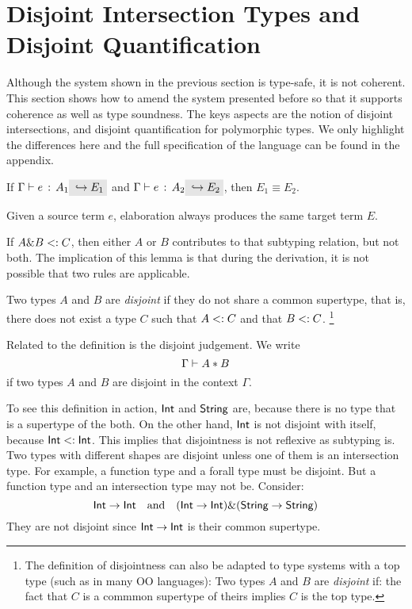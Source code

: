 \section{Disjoint Intersection Types and Disjoint Quantification}

Although the system shown in the previous section is type-safe, it is not
coherent. This section shows how to amend the system presented before so that it
supports coherence as well as type soundness. The keys aspects are the notion of
disjoint intersections, and disjoint quantification for polymorphic types. We
only highlight the differences here and the full specification of the language
can be found in the appendix.

\begin{theorem} \label{unique-elaboration}
  If $\jtype \Gamma e {A_1} \yields {E_1}$ and $\jtype \Gamma e {A_2}
  \yields {E_2}$, then $E_1 \equiv E_2$.
\end{theorem}

Given a source term $e$, elaboration always produces the same target term $E$.


If $A \& B <: C$, then either $A$ or $B$ contributes to that subtyping
relation, but not both. The implication of this lemma is that during the
derivation, it is not possible that two rules are applicable.

\begin{definition}
  Two types $A$ and $B$ are \emph{disjoint} if they do not share a common
  supertype, that is, there does not exist a type $C$ such that $A <: C$
  and that $B <: C$. \footnote{
  The definition of disjointness can also be adapted to type systems with a top
  type (such as \lstinline@Object@ in many OO languages): Two types $A$ and $B$
  are \emph{disjoint} if: the fact that $C$ is a commmon supertype of theirs
  implies $C$ is the top type.
  }
\end{definition}

Related to the definition is the disjoint judgement. We write
\[ \Gamma \vdash A * B \]
if two types $A$ and $B$ are disjoint in the context $\Gamma$.

To see this definition in action, $\textsf{Int}$ and $\textsf{String}$ are, because there is
no type that is a supertype of the both. On the other hand, $\textsf{Int}$ is not
disjoint with itself, because $\textsf{Int} <: \textsf{Int}$. This implies that
disjointness is not reflexive as subtyping is. Two types with different shapes
are disjoint unless one of them is an intersection type. For example, a function
type and a forall type must be disjoint. But a function type and an intersection
type may not be. Consider:
\[ \textsf{Int} \to \textsf{Int} \quad \text{and} \quad (\textsf{Int} \to \textsf{Int}) \& (\textsf{String} \to \textsf{String}) \]
They are not disjoint since $\textsf{Int} \to \textsf{Int}$ is their common supertype.

